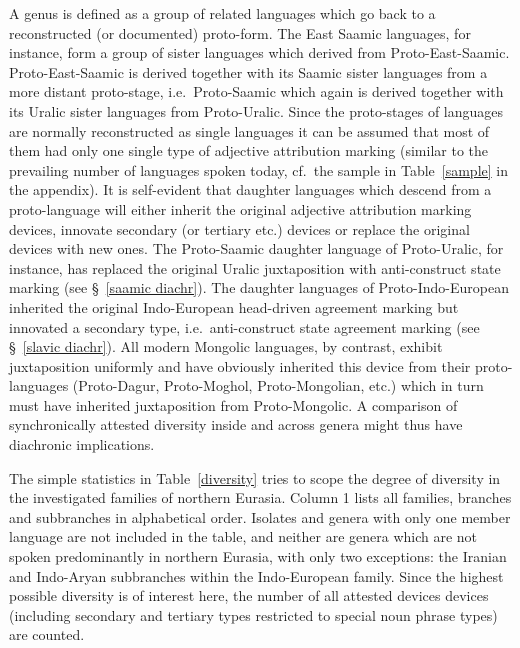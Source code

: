 A genus is defined as a group of related languages which go back to a reconstructed (or documented) proto-form. The East Saamic languages, for instance, form a group of sister languages which derived from Proto-East-Saamic. Proto-East-Saamic is derived together with its Saamic sister languages from a more distant proto-stage, i.e.~Proto-Saamic which again is derived together with its Uralic sister languages from Proto-Uralic. Since the proto-stages of languages are normally reconstructed as single languages it can be assumed that most of them had only one single type of adjective attribution marking (similar to the prevailing number of languages spoken today, cf.~the sample in Table~\ref{sample} in the appendix). It is self-evident that daughter languages which descend from a proto-language will either inherit the original adjective attribution marking devices, innovate secondary (or tertiary etc.) devices or replace the original devices with new ones. The Proto-Saamic daughter language of Proto-Uralic, for instance, has replaced the original Uralic juxtaposition with anti-construct state marking (see \S~\ref{saamic diachr}). The  daughter languages of Proto-Indo-European inherited the original Indo-European head-driven agreement marking but innovated a secondary type, i.e.~anti-construct state agreement marking (see \S~\ref{slavic diachr}). All modern Mongolic languages, by contrast, exhibit juxtaposition uniformly and have obviously inherited this device from their proto-languages (Proto-Dagur, Proto-Moghol, Proto-Mongolian, etc.) which in turn must have inherited juxtaposition from Proto-Mongolic. A comparison of synchronically attested diversity inside and across genera might thus have diachronic implications.

The simple statistics in Table~\ref{diversity} tries to scope the degree of diversity in the investigated families of northern Eurasia. Column 1 lists all families, branches and subbranches in alphabetical order. Isolates and genera with only one member language are not included in the table, and neither are genera which are not spoken predominantly in northern Eurasia, with only two exceptions: the Iranian and Indo-Aryan subbranches within the Indo-European family. Since the highest possible diversity is of interest here, the number of all attested devices devices (including secondary and tertiary types restricted to special noun phrase types) are counted. 


